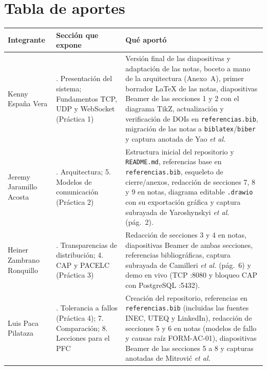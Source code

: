 \documentclass[11pt,a4paper]{article}
\begin{document}
\section*{Tabla de aportes}
\begin{center}
\small
\begin{tabularx}{\linewidth}{>{\raggedright\arraybackslash}p{4cm}
                             >{\raggedright\arraybackslash}p{4cm}
                             >{\raggedright\arraybackslash}X}
\toprule
\textbf{Integrante} & \textbf{Sección que expone} & \textbf{Qué aportó}\\
\midrule
Kenny España Vera        & 1. Presentación del sistema; Fundamentos TCP, UDP y WebSocket (Práctica 1) & Versión final de las diapositivas y adaptación de las notas, boceto a mano de la arquitectura (Anexo~A), primer borrador LaTeX de las notas, diapositivas Beamer de las secciones 1 y 2 con el diagrama TikZ, actualización y verificación de DOIs en \texttt{referencias.bib}, migración de las notas a \texttt{biblatex}/\texttt{biber} y captura anotada de Yao \emph{et al.} \\
Jeremy Jaramillo Acosta  & 2. Arquitectura; 5. Modelos de comunicación (Práctica 2) & Estructura inicial del repositorio y \texttt{README.md}, referencias base en \texttt{referencias.bib}, esqueleto de cierre/anexos, redacción de secciones 7, 8 y 9 en notas, diagrama editable \texttt{.drawio} con su exportación gráfica y captura subrayada de Yaroshynskyi \emph{et al.} (pág.~2). \\
Heiner Zambrano Ronquillo& 3. Transparencias de distribución; 4. CAP y PACELC (Práctica 3) & Redacción de secciones 3 y 4 en notas, diapositivas Beamer de ambas secciones, referencias bibliográficas, captura subrayada de Camilleri \emph{et al.} (pág.~6) y demo en vivo (TCP :8080 y bloqueo CAP con PostgreSQL :5432). \\
Luis Paca Pilataza       & 6. Tolerancia a fallos (Práctica 4); 7. Comparación; 8. Lecciones para el PFC & Creación del repositorio, referencias en \texttt{referencias.bib} (incluidas las fuentes INEC, UTEQ y LinkedIn), redacción de secciones 5 y 6 en notas (modelos de fallo y causas raíz FORM-AC-01), diapositivas Beamer de las secciones 5 a 8 y capturas anotadas de Mitrović \emph{et al.} \\
\bottomrule
\end{tabularx}
\end{center}
\end{document}
